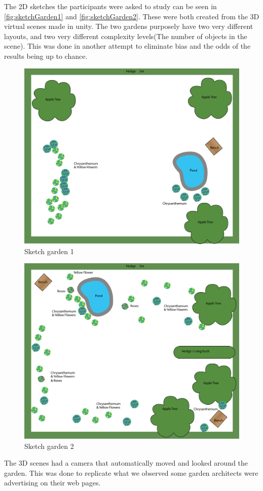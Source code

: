 The 2D sketches the participants were asked to study can be seen in \autoref{fig:sketchGarden1} and \autoref{fig:sketchGarden2}. These were both created from the 3D virtual scenes made in unity. The two gardens purposely have two very different layouts, and two very different complexity levels(The number of objects in the scene). This was done in another attempt to eliminate bias and the odds of the results being up to chance.
\begin{multicols}{2}
\begin{figure}[H]
	\centering
	\includegraphics[width=1.0\linewidth]{figure/Evaluation/Garden1.png}
	\caption{Sketch garden 1}
	\label{fig:sketchGarden1}
\end{figure}
\columnbreak
\begin{figure}[H]
	\centering
	\includegraphics[width=1.0\linewidth]{figure/Evaluation/Garden2.png}
	\caption{Sketch garden 2}
	\label{fig:sketchGarden2}
\end{figure}
\end{multicols}
The 3D scenes had a camera that automatically moved and looked around the garden. This was done to replicate what we observed some garden architects were advertising on their web pages.


